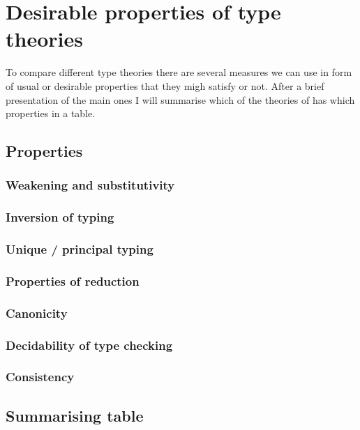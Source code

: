 \chapter{Desirable properties of type theories}

To compare different type theories there are several measures we can use in
form of usual or desirable properties that they migh satisfy or not.
After a brief presentation of the main ones I will summarise which of the
theories of  has which properties in a table.

\section{Properties}

\subsection{Weakening and substitutivity}


\subsection{Inversion of typing}

\subsection{Unique / principal typing}

\subsection{Properties of reduction}

\subsection{Canonicity}

\subsection{Decidability of type checking}

\subsection{Consistency}

\section{Summarising table}